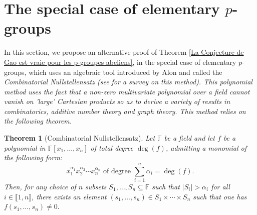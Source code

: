 \documentclass[english,12pt,a4paper,twoside]{smfart}
\theoremstyle{plain}
\newtheorem{theorem}{Theorem}[section]
\theoremstyle{definition}
\theoremstyle{remark}
\begin{document}
\section{The special case of elementary $p$-groups}
\label{Section p-groupes elementaires} 
In this section, we propose an alternative proof of Theorem \ref{La Conjecture de Gao est vraie pour les p-groupes abeliens}, in the special case of elementary $p$-groups, which uses an algebraic tool introduced by Alon and called the \em Combinatorial Nullstellensatz \em (see \cite{Alon99} for a survey on this method). This polynomial method uses the fact that a non-zero multivariate polynomial over a field cannot vanish on 'large' Cartesian products so as to derive a variety of results in combinatorics, additive number theory and graph theory. This method relies on the following theorem. 

\begin{theorem}[Combinatorial Nullstellensatz]
\label{Combinatorial Nullstellensatz} Let $\mathbb{F}$ be a field and let $f$ be a
polynomial in $\mathbb{F}[x_1,\dots,x_n]$ of total degree
$\deg(f)$, admitting a monomial of the following form:
$$x^{\alpha_1}_1 x^{\alpha_2}_2 \cdots x^{\alpha_n}_n \text{ of degree }
\displaystyle\sum^n_{i=1} \alpha_i=\deg(f).$$
Then, for any choice of $n$ subsets $S_1,\dots ,S_n \subseteq
\mathbb{F}$ such that $|S_i|> \alpha_i$ for all $i \in
\llbracket1,n\rrbracket$, there exists an element $(s_1,\dots,s_n)
\in S_1 \times \cdots \times S_n$ such that one has
$f(s_1,\dots,s_n) \neq 0.$
\end{theorem}
\end{document}
